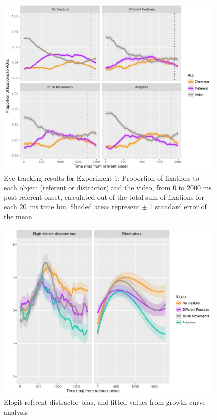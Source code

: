 \documentclass[a4paper,man,natbib]{apa6}
\begin{document}
\begin{figure}[Ht]
  \centering
	\includegraphics[width=\linewidth]{./img/e7_fixations.pdf}
  \caption{Eye-tracking results for Experiment 1: Proportion of fixations to each object (referent or distractor) and the video, from 0 to 2000 ms post-referent onset, calculated out of the total sum of fixations for each 20~ms time bin. Shaded areas represent $\pm$ 1 standard error of the mean.}
  \label{fig:v1_eye}
\end{figure}

\begin{figure}[Ht]
  \centering
	\includegraphics[width=\linewidth]{./img/e7_gcamodel.pdf}
  \caption{Elogit referent-distractor bias, and fitted values from growth curve analysis}
  \label{fig:v1_gca}
\end{figure}
\end{document}
